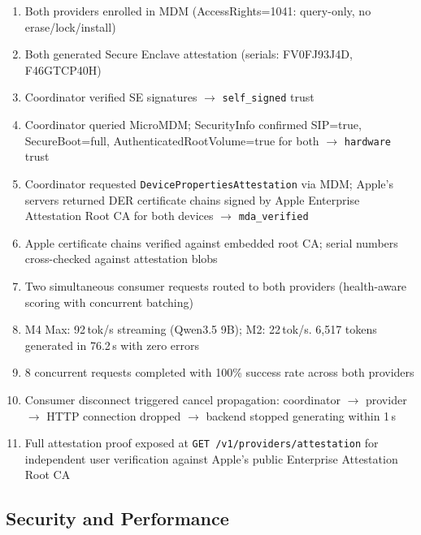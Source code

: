 \documentclass[10pt,twocolumn,letterpaper]{article}
\begin{document}
\begin{enumerate}[leftmargin=*,itemsep=1pt]
    \item Both providers enrolled in MDM (AccessRights=1041: query-only, no erase/lock/install)
    \item Both generated Secure Enclave attestation (serials: FV0FJ93J4D, F46GTCP40H)
    \item Coordinator verified SE signatures $\to$ \texttt{self\_signed} trust
    \item Coordinator queried MicroMDM; SecurityInfo confirmed SIP=true, SecureBoot=full, AuthenticatedRootVolume=true for both $\to$ \texttt{hardware} trust
    \item Coordinator requested \texttt{DevicePropertiesAttestation} via MDM; Apple's servers returned DER certificate chains signed by Apple Enterprise Attestation Root CA for both devices $\to$ \texttt{mda\_verified}
    \item Apple certificate chains verified against embedded root CA; serial numbers cross-checked against attestation blobs
    \item Two simultaneous consumer requests routed to both providers (health-aware scoring with concurrent batching)
    \item M4 Max: 92\,tok/s streaming (Qwen3.5 9B); M2: 22\,tok/s. 6,517 tokens generated in 76.2\,s with zero errors
    \item 8 concurrent requests completed with 100\% success rate across both providers
    \item Consumer disconnect triggered cancel propagation: coordinator $\to$ provider $\to$ HTTP connection dropped $\to$ backend stopped generating within 1\,s
    \item Full attestation proof exposed at \texttt{GET /v1/providers/attestation} for independent user verification against Apple's public Enterprise Attestation Root CA
\end{enumerate}

\subsection{Security and Performance}
\end{document}
